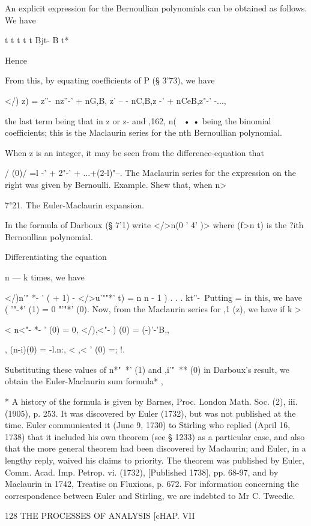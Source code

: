 An explicit expression for the Bernoullian polynomials can be obtained
as follows. We have

t t t t t Bjt- B t*

Hence

From this, by equating coefficients of P (§ 3'73), we have

</) z) = z''-\ nz''-' + nG,B, z' -- - nC,B,z -' + nCeB,z"-' -...,

the last term being that in z or z- and ,162, n( \, • • being the
binomial coefficients; this is the Maclaurin series for the nth
Bernoullian polynomial.

When z is an integer, it may be seen from the difference-equation that

 / (0)/ =l -' + 2"-' + ...+(2-l)"--. The Maclaurin series for the
expression on the right was given by Bernoulli. Example. Shew that,
when n>\,

7"21. The Euler-Maclaurin expansion.

In the formula of Darboux (§ 7'1) write </>n(0 ' 4' )> where (f>n t)
is the ?ith Bernoullian polynomial.

Differentiating the equation

n — k times, we have

</)n'" *- ' ( + 1) - </>u'""*' t) = n n - 1 ) . . . kt''-\ Putting =
in this, we have ( '"-*' (1) = 0 "'"*' (0). Now, from the Maclaurin
series for ,1 (z), we have if k >

< n<"- *- ' (0) = 0, </),<"- ) (0) = (-)'-'B,,

 , (n-i)(0) = -l.n:, < ,< ' (0) =; !.

Substituting these values of n*"~*' (1) and ,i'"~** (0) in Darboux's
result, we obtain the Euler-Maclaurin sum formula* ,

* A history of the formula is given by Barnes, Proc. London Math. Soc.
(2), iii. (1905), p. 253. It was discovered by Euler (1732), but was
not published at the time. Euler communicated it (June 9, 1730) to
Stirling who replied (April 16, 1738) that it included his own theorem
(see § 1233) as a particular case, and also that the more general
theorem had been discovered by Maclaurin; and Euler, in a lengthy
reply, waived his claims to priority. The theorem was published by
Euler, Comm. Acad. Imp. Petrop. vi. (1732), [Published 1738], pp.
68-97, and by Maclaurin in 1742, Treatise on Fluxions, p. 672. For
information concerning the correspondence between Euler and Stirling,
we are indebted to Mr C. Tweedie.

128 THE PROCESSES OF ANALYSIS [cHAP. VII


